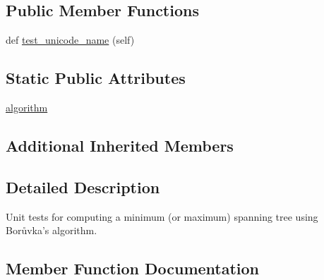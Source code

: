 \subsection*{Public Member Functions}
\begin{DoxyCompactItemize}
\item 
def \hyperlink{classnetworkx_1_1algorithms_1_1tree_1_1tests_1_1test__mst_1_1TestBoruvka_a4d1140f53682aaee1955c4f51d3a45e9}{test\+\_\+unicode\+\_\+name} (self)
\end{DoxyCompactItemize}
\subsection*{Static Public Attributes}
\begin{DoxyCompactItemize}
\item 
\hyperlink{classnetworkx_1_1algorithms_1_1tree_1_1tests_1_1test__mst_1_1TestBoruvka_ab2db7ecf0d2a2c3e496d7b6511c05277}{algorithm}
\end{DoxyCompactItemize}
\subsection*{Additional Inherited Members}


\subsection{Detailed Description}
\begin{DoxyVerb}Unit tests for computing a minimum (or maximum) spanning tree
using Borůvka's algorithm.\end{DoxyVerb}
 

\subsection{Member Function Documentation}
\mbox{\label{classnetworkx_1_1algorithms_1_1tree_1_1tests_1_1test__mst_1_1TestBoruvka_a4d1140f53682aaee1955c4f51d3a45e9}} 
